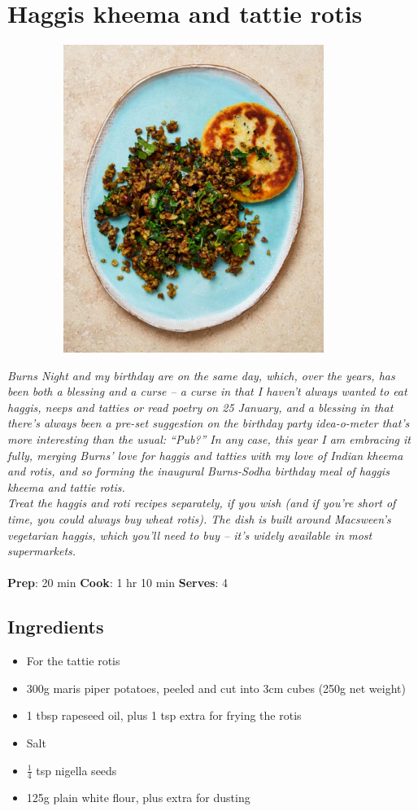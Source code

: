 \documentclass{book}
\begin{document}
\section{Haggis kheema and tattie rotis}
\begin{figure}
\centering\includegraphics[width=10cm,height=10cm,keepaspectratio]{Recipe_Pictures/Haggis_kheema_and_tattie_rotis.png}
\end{figure}
\emph{Burns Night and my birthday are on the same day, which, over the years, has been both a blessing and a curse – a curse in that I haven’t always wanted to eat haggis, neeps and tatties or read poetry on 25 January, and a blessing in that there’s always been a pre-set suggestion on the birthday party idea-o-meter that’s more interesting than the usual: “Pub?” In any case, this year I am embracing it fully, merging Burns’ love for haggis and tatties with my love of Indian kheema and rotis, and so forming the inaugural Burns-Sodha birthday meal of haggis kheema and tattie rotis.\\ 
Treat the haggis and roti recipes separately, if you wish (and if you’re short of time, you could always buy wheat rotis). The dish is built around Macsween’s vegetarian haggis, which you’ll need to buy – it’s widely available in most supermarkets.}\\\\ 
\textbf{Prep}: 20 min
\textbf{Cook}: 1 hr 10 min
\textbf{Serves}: 4
\subsection*{Ingredients}
\begin{itemize}
\item For the tattie rotis
\item 300g maris piper potatoes, peeled and cut into 3cm cubes (250g net weight)
\item 1 tbsp rapeseed oil, plus 1 tsp extra for frying the rotis
\item Salt
\item $\frac{1}{4}$ tsp nigella seeds
\item 125g plain white flour, plus extra for dusting
\end{itemize}
\end{document}
